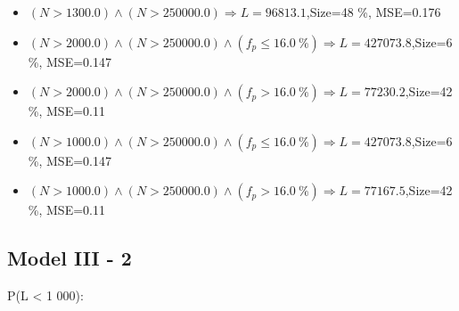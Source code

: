 \documentclass[numbered]{CSL}
\begin{document}
\begin{itemize}
\item $(N > 1300.0) \land (N > 250000.0) \Rightarrow L = 96813.1$,\hfill Size=48 \%, MSE=0.176
\item $(N > 2000.0) \land (N > 250000.0) \land (f_p \leq 16.0~\%) \Rightarrow L = 427073.8$,\hfill Size=6 \%, MSE=0.147
\item $(N > 2000.0) \land (N > 250000.0) \land (f_p > 16.0~\%) \Rightarrow L = 77230.2$,\hfill Size=42 \%, MSE=0.11
\item $(N > 1000.0) \land (N > 250000.0) \land (f_p \leq 16.0~\%) \Rightarrow L = 427073.8$,\hfill Size=6 \%, MSE=0.147
\item $(N > 1000.0) \land (N > 250000.0) \land (f_p > 16.0~\%) \Rightarrow L = 77167.5$,\hfill Size=42 \%, MSE=0.11
\end{itemize}

\subsection{Model III - 2}
P(L < 1 000):
\end{document}
